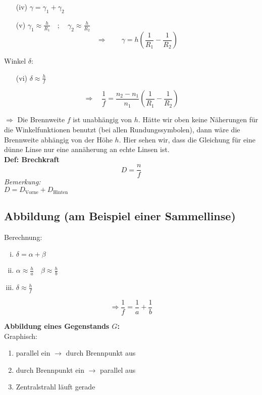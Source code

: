 \documentclass[titlepage,11pt,a4paper,ngerman]{report}
\newcommand{\tx}[1]{\textrm{#1}}
\newcommand{\lcom}[1]{\color{MidnightBlue}#1\color{black}}
\newcommand{\frbox}[2]{\begin{tcolorbox}[colback=white,colframe=red!75!black,fonttitle=\bfseries,title=#1]#2\end{tcolorbox}}
\begin{document}

\begin{enumerate}
	\item[(iv)] $ \gamma = \gamma_1 + \gamma_2 $
	\item[(v)] $ \gamma_1 \approx \frac{h}{R_1} \quad ;\quad \gamma_2 \approx \frac{h}{R_2} $
	\begin{equation*}
	\Rightarrow \qquad \gamma = h \left(\frac{1}{R_1} - \frac{1}{R_2}\right)
	\end{equation*}
\end{enumerate}
Winkel $ \delta $:


\begin{enumerate}
	\item[(vi)] $ \delta \approx \frac{h}{f} $
\end{enumerate}



\frbox{Linsenschleiferformel}{\begin{equation*}
\Rightarrow \quad \frac{1}{f} = \frac{n_2 - n_1}{n_1} \left(\frac{1}{R_1} - \frac{1}{R_2}\right)
\end{equation*}}
$ \Rightarrow $ Die Brennweite $ f $ ist unabhängig von $ h $. \lcom{Hätte wir oben keine Näherungen für die Winkelfunktionen benutzt (bei allen Rundungssymbolen), dann wäre die Brennweite abhängig von der Höhe $ h $. Hier sehen wir, dass die Gleichung für eine dünne Linse nur eine annäherung an echte Linsen ist.}\\[10pt]
\textbf{Def: Brechkraft}
\begin{equation*}
D = \frac{n}{f}
\end{equation*}
\emph{Bemerkung:}\\
$ D = D_{\tx{Vorne}} + D_{\tx{Hinten}} $

\subsection{Abbildung (am Beispiel einer Sammellinse)}


\noindent
Berechnung:
\begin{enumerate}[i)]
	\item $ \delta = \alpha + \beta $
	\item $ \alpha \approx \frac{h}{a} \quad \beta \approx \frac{h}{b} $
	\item $ \delta \approx \frac{h}{f} $
\end{enumerate}
\frbox{Abbildungsgesetz}{\begin{equation*}
\Rightarrow \frac{1}{f} = \frac{1}{a} + \frac{1}{b}
\end{equation*}}
\textbf{Abbildung eines Gegenstands $ G $:}\\
Graphisch:
\begin{enumerate}[(1)]
	\item parallel ein $ \rightarrow $ durch Brennpunkt aus
	\item durch Brennpunkt ein $ \rightarrow $ parallel aus
	\item Zentralstrahl läuft gerade
\end{enumerate}
\end{document}
